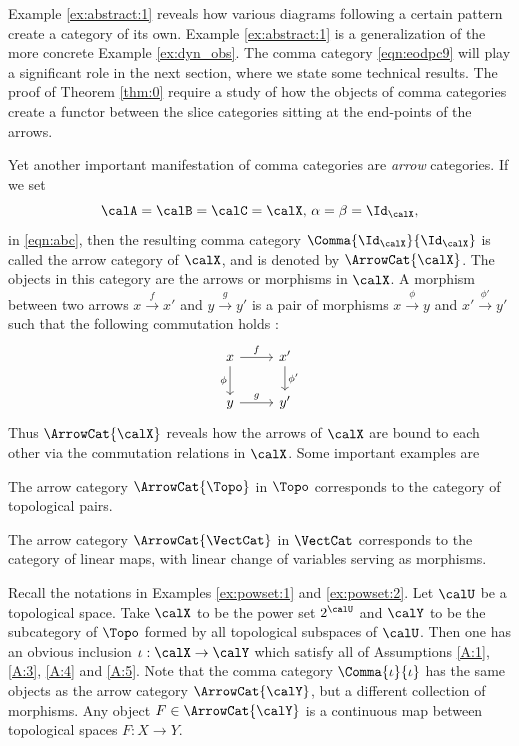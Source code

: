 \documentclass[12pt,oneside]{article}
\begin{document}
Example \ref{ex:abstract:1} reveals how various diagrams following a certain pattern create a category of its own. Example \ref{ex:abstract:1} is a generalization of the more concrete Example \ref{ex:dyn_obs}. The comma category \eqref{eqn:eodpc9} will play a significant role in the next section, where we state some technical results. The proof of Theorem \ref{thm:0} require a study of how the objects of comma categories create a functor between the slice categories sitting at the end-points of the arrows. 

Yet another important manifestation of comma categories are \emph{arrow} categories. If we set
%
\[ \calA = \calB = \calC = \calX, \, \alpha = \beta = \Id_{\calX} , \]
%
in \eqref{eqn:abc}, then the resulting comma category $\Comma{\Id_{\calX}}{\Id_{\calX}}$ is called the arrow category of $\calX$, and is denoted by $\ArrowCat{\calX}$. The objects in this category are the arrows or morphisms in $\calX$. A morphism between two arrows $x \xrightarrow{f} x'$ and $y \xrightarrow{g} y'$ is a pair of morphisms $x \xrightarrow{\phi} y$ and $x' \xrightarrow{\phi'} y'$ such that the following commutation holds :
%
\[\begin{tikzcd}
	x \arrow[r, "f"] \arrow[d, "\phi"'] & x' \arrow[d, "\phi'"] \\
	y \arrow[r, "g"] & y' 
\end{tikzcd}\]
%
Thus $\ArrowCat{\calX}$ reveals how the arrows of $\calX$ are bound to each other via the commutation relations in $\calX$. Some important examples are

\begin{example} \label{ex:Topo:1}
	The arrow category $\ArrowCat{\Topo}$ in $\Topo$ corresponds to the category of topological pairs. 
\end{example}

\begin{example} \label{ex:Vect:1}
	The arrow category $\ArrowCat{\VectCat}$ in $\VectCat$ corresponds to the category of linear maps, with linear change of variables serving as morphisms. 
\end{example}

\begin{example} \label{ex:powset:5}
Recall the notations in Examples \ref{ex:powset:1} and \ref{ex:powset:2}. Let $\calU$ be a topological space. Take $\calX$ to be the power set $2^{\calU}$ and $\calY$ to be the subcategory of $\Topo$ formed by all topological subspaces of $\calU$. Then one has an obvious inclusion $\iota : \calX \to \calY$ which satisfy all of Assumptions \ref{A:1}, \ref{A:3}, \ref{A:4} and \ref{A:5}. Note that the comma category $\Comma{\iota}{\iota}$ has the same objects as the arrow category $\ArrowCat{\calY}$, but a different collection of morphisms. Any object $F\in \ArrowCat{\calY}$ is a continuous map between topological spaces $F:X\to Y$. 
\end{example}
\end{document}
